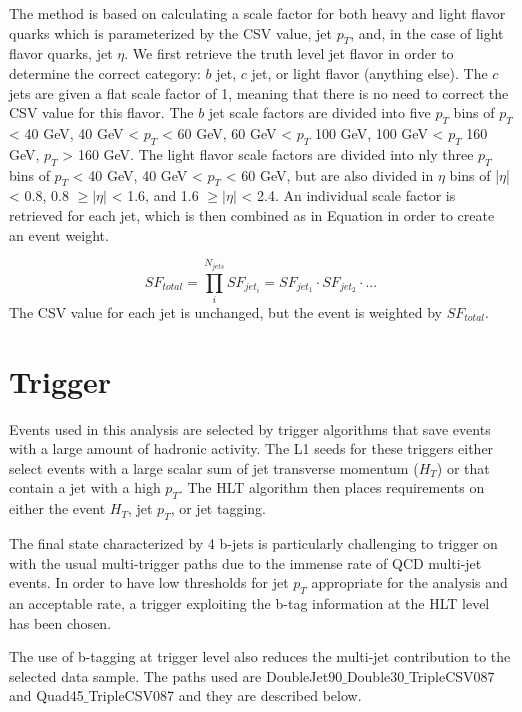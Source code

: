The method is based on calculating a scale factor for both heavy and light flavor quarks which is parameterized by the CSV value, jet $p_{T}$, and, in the case of light flavor quarks, jet $\eta$. We first retrieve the truth level jet flavor in order to determine the correct category: $b$ jet, $c$ jet, or light flavor (anything else). The $c$ jets are given a flat scale factor of 1, meaning that there is no need to correct the CSV value for this flavor. The $b$ jet scale factors are divided into five $p_{T}$ bins of $p_{T}$ < 40 GeV, 40 GeV <  $p_{T}$ < 60 GeV, 60 GeV <  $p_{T}$ 100 GeV, 100 GeV <  $p_{T}$ 160 GeV, $p_{T}$ > 160 GeV. The light flavor scale factors are divided into nly three $p_{T}$ bins of $p_{T}$ < 40 GeV, 40 GeV <  $p_{T}$ < 60 GeV, but are also divided in $\eta$ bins of |$\eta$| < 0.8, 0.8 $\geq |\eta|$ < 1.6, and 1.6 $\geq |\eta|$ < 2.4. An individual scale factor is retrieved for each jet, which is then combined as in Equation in order to create an event weight.

\begin{equation}
SF_{total} = \prod_{i}^{N_{jets}}SF_{jet_{i}} = SF_{jet_{1}}\cdot SF_{jet_{2}}\cdot ... 
\end{equation}
The CSV value for each jet is unchanged, but the event is weighted by $SF_{total}$.

\section{Trigger \label{sec:trigger}}

Events used in this analysis are selected by trigger algorithms that save events with a large amount of hadronic activity. The L1 seeds for these triggers either select events with a large scalar sum of jet transverse momentum ($H_{T}$) or that contain a jet with a high $p_{T}$. The HLT algorithm then places requirements on either the event $H_{T}$, jet $p_{T}$, or jet tagging. 

The final state characterized by 4 b-jets is particularly challenging to trigger on with the usual multi-trigger paths due to the immense rate of QCD multi-jet events. In order to have low thresholds for jet $p_{T}$ appropriate for the analysis and an acceptable rate, a trigger exploiting the b-tag information at the HLT level has been chosen.

The use of b-tagging at trigger level also reduces the multi-jet contribution to the selected data sample. The paths used are DoubleJet90$\_$Double30$\_$TripleCSV087 and Quad45$\_$TripleCSV087 and they are described below. 

